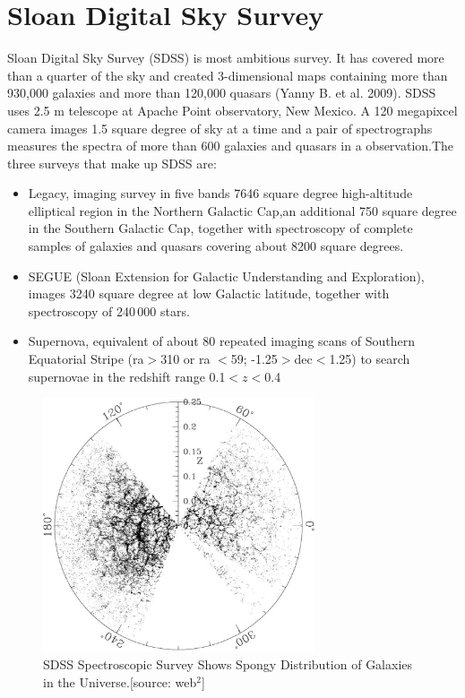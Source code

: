 \section{Sloan Digital Sky Survey}
Sloan Digital Sky Survey (SDSS) is most ambitious survey. It has covered more than a quarter of the sky and created 3-dimensional maps containing more than 930,000 galaxies and more than 120,000 quasars (Yanny B. et al. 2009). SDSS uses 2.5 m telescope at Apache Point observatory, New Mexico. A 120 megapixcel camera images 1.5 square degree of sky at a time and a pair of spectrographs measures the spectra of more than 600 galaxies and quasars in a observation.The three surveys that make up SDSS are:
\begin{itemize}
\item Legacy, imaging survey in five bands 7646 square degree high-altitude elliptical region in the Northern Galactic Cap,an additional 750 square degree in the Southern Galactic Cap, together with spectroscopy of complete samples of galaxies and quasars covering about 8200 square degrees.
\item SEGUE (Sloan Extension for Galactic Understanding and Exploration), images 3240 square degree at low Galactic latitude, together with spectroscopy of 240\,000 stars. 
\item Supernova, equivalent of about 80 repeated imaging scans of Southern Equatorial Stripe (ra$>$310 or ra $<$59; -1.25$>$dec$<$1.25) to search supernovae in the redshift range 0.1$<z<$0.4
\end{itemize} 
\begin{figure}[H]
\begin{center}
 \includegraphics[height=7.5cm]{SDSS.eps}
        \caption{SDSS Spectroscopic Survey Shows Spongy Distribution of Galaxies in the Universe.[source: web$^2$]}\label{SDSS}
 \end{center}  
\end{figure}
